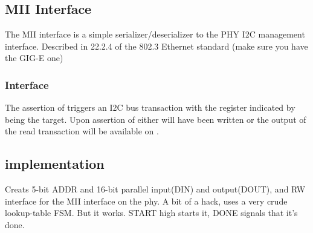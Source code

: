 \subsection{MII Interface} 

The MII interface is a simple serializer/deserializer to the PHY I2C management interface. Described in 22.2.4 of the 802.3 Ethernet standard (make sure you have the GIG-E one)

 
\subsubsection{Interface} 
The assertion of  triggers an I2C bus transaction with the register indicated by \signal{ADDR[5:0} being the target. Upon assertion of  either  will have been written or the output of the read transaction will be available on . 

\subsection{implementation}

Creats 5-bit ADDR and 16-bit parallel input(DIN) and output(DOUT), and
RW interface for the MII interface on the phy. A bit of a hack, uses a
very crude lookup-table FSM. But it works. START high starts it, DONE
signals that it's done. 

